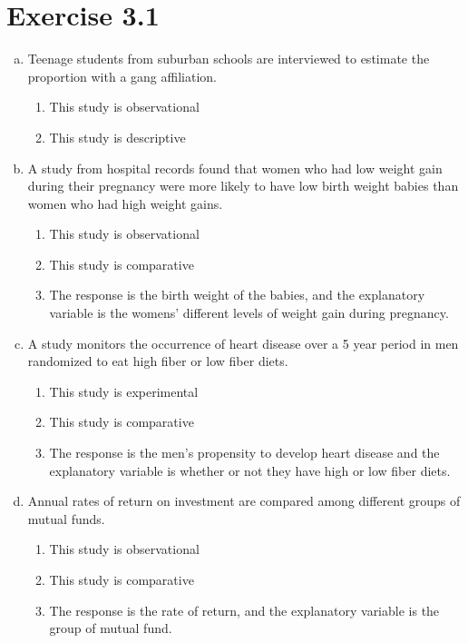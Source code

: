 \documentclass{article}
\begin{document}
\begin{minipage}{6in}
\section*{Exercise 3.1}

\begin{enumerate}[a)]
	\item Teenage students from suburban schools are interviewed to estimate the proportion with a gang affiliation.
	\begin{enumerate}
		\item This study is observational
		\item This study is descriptive
	\end{enumerate}
	\item A study from hospital records found that women who had low weight gain during their pregnancy were more likely to have low birth weight babies than women who had high weight gains.
	\begin{enumerate}
		\item This study is observational
		\item This study is comparative
		\item The response is the birth weight of the babies, and the explanatory variable is the womens' different levels of weight gain during pregnancy.
	\end{enumerate}
	\item A study monitors the occurrence of heart disease over a 5 year period in men randomized to eat high fiber or low fiber diets.
	\begin{enumerate}
		\item This study is experimental
		\item This study is comparative
		\item The response is the men's propensity to develop heart disease and the explanatory variable is whether or not they have high or low fiber diets.
	\end{enumerate}
	\item Annual rates of return on investment are compared among different groups of mutual funds.
	\begin{enumerate}
		\item This study is observational
		\item This study is comparative
		\item The response is the rate of return, and the explanatory variable is the group of mutual fund.
	\end{enumerate}
\end{enumerate}

\end{minipage}
\end{document}
